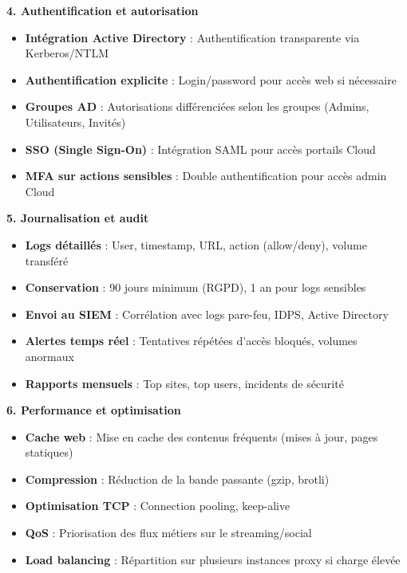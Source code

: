 \newpage

\noindent \textbf{4. Authentification et autorisation}
\begin{itemize}
  \item \textbf{Intégration Active Directory} : Authentification transparente via Kerberos/NTLM
  \item \textbf{Authentification explicite} : Login/password pour accès web si nécessaire
  \item \textbf{Groupes AD} : Autorisations différenciées selon les groupes (Admins, Utilisateurs, Invités)
  \item \textbf{SSO (Single Sign-On)} : Intégration SAML pour accès portails Cloud
  \item \textbf{MFA sur actions sensibles} : Double authentification pour accès admin Cloud
\end{itemize}

\medskip

\noindent \textbf{5. Journalisation et audit}
\begin{itemize}
  \item \textbf{Logs détaillés} : User, timestamp, URL, action (allow/deny), volume transféré
  \item \textbf{Conservation} : 90 jours minimum (RGPD), 1 an pour logs sensibles
  \item \textbf{Envoi au SIEM} : Corrélation avec logs pare-feu, IDPS, Active Directory
  \item \textbf{Alertes temps réel} : Tentatives répétées d'accès bloqués, volumes anormaux
  \item \textbf{Rapports mensuels} : Top sites, top users, incidents de sécurité
\end{itemize}

\medskip

\noindent \textbf{6. Performance et optimisation}
\begin{itemize}
  \item \textbf{Cache web} : Mise en cache des contenus fréquents (mises à jour, pages statiques)
  \item \textbf{Compression} : Réduction de la bande passante (gzip, brotli)
  \item \textbf{Optimisation TCP} : Connection pooling, keep-alive
  \item \textbf{QoS} : Priorisation des flux métiers sur le streaming/social
  \item \textbf{Load balancing} : Répartition sur plusieurs instances proxy si charge élevée
\end{itemize}

